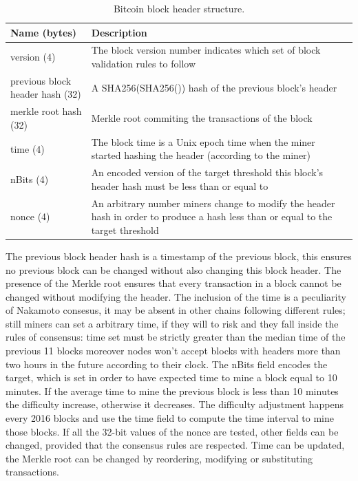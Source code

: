 \begin{table}
\begin{center}
\begin{tabular}{|p{5cm}|p{5cm}|}
	\hline
	\textbf{Name} (bytes) & \textbf{Description} \\ \hline
	version (4) & The block version number indicates which set of block validation rules to follow \\ \hline
	previous block header hash (32) & A SHA256(SHA256()) hash of the previous block’s header \\ \hline
	merkle root hash (32) & Merkle root commiting the transactions of the block \\ \hline
	time (4) & The block time is a Unix epoch time when the miner started hashing the header (according to the miner) \\ \hline
	nBits (4) & An encoded version of the target threshold this block’s header hash must be less than or equal to \\ \hline
	nonce (4) & An arbitrary number miners change to modify the header hash in order to produce a hash less than or equal to the target threshold \\ \hline
\end{tabular}
\end{center}
\caption[Bitcoin block header structure.]{Bitcoin block header structure.}
\label{tab:block-header}
\end{table}
The previous block header hash is a timestamp of the previous block, this ensures no previous block can be changed without also changing this block header.
The presence of the Merkle root ensures that every transaction in a block cannot be changed without modifying the header.
The inclusion of the time is a peculiarity of Nakamoto consesus, it may be absent in other chains following different rules; still miners can set a arbitrary time, if they will to risk and they fall inside the rules of consensus: time set must be strictly greater than the median time of the previous 11 blocks moreover nodes won't accept blocks with headers more than two hours in the future according to their clock. 
The nBits field encodes the target, which is set in order to have expected time to mine a block equal to 10 minutes. If the average time to mine the previous block is less than 10 minutes the difficulty increase, otherwise it decreases. The difficulty adjustment happens every 2016 blocks and use the time field to compute the time interval to mine those blocks.
If all the 32-bit values of the nonce are tested, other fields can be changed, provided that the consensus rules are respected. Time can be updated, the Merkle root can be changed by reordering, modifying or substituting transactions. 

